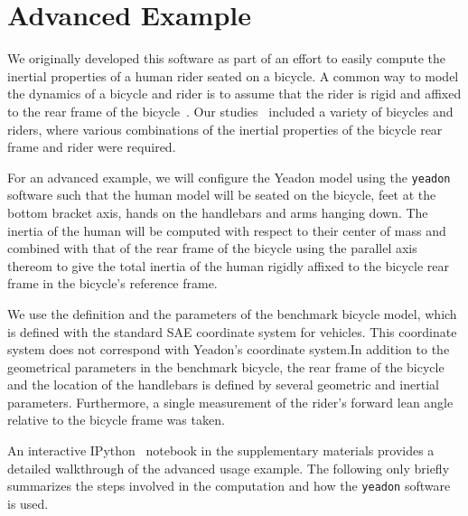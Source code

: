 \documentclass[10pt]{article}
\begin{document}
\section*{Advanced Example}
\label{sec:advanced-example}

We originally developed this software as part of an effort to easily compute
the inertial properties of a human rider seated on a bicycle. A common way to
model the dynamics of a bicycle and rider is to assume that the rider is rigid
and affixed to the rear frame of the bicycle~\cite{Meijaard2007a}. Our
studies~\cite{Moore2012} included a variety of bicycles and riders, where
various combinations of the inertial properties of the bicycle rear frame and
rider were required.

For an advanced example, we will configure the Yeadon model using the
\verb+yeadon+ software such that the human model will be seated on the bicycle, feet at the
bottom bracket axis, hands on the handlebars and arms hanging down. The inertia
of the human will be computed with respect to their center of mass and combined
with that of the rear frame of the bicycle using the parallel axis thereom to
give the total inertia of the human rigidly affixed to the bicycle rear frame
in the bicycle's reference frame.

We use the definition and the parameters of the benchmark bicycle model,
\cite{Meijaard2007a} which is defined with the standard SAE coordinate system
for vehicles. This coordinate system does not correspond with Yeadon's
coordinate system.In addition to the geometrical parameters in the benchmark
bicycle, the rear frame of the bicycle and the location of the handlebars is
defined by several geometric and inertial parameters.  Furthermore, a single
measurement of the rider's forward lean angle relative to the bicycle frame was
taken.

An interactive IPython~\cite{Perez2007} notebook in the supplementary materials
provides a detailed walkthrough of the advanced usage example. The following
only briefly summarizes the steps involved in the computation and how the
\verb+yeadon+ software is used.
\end{document}
